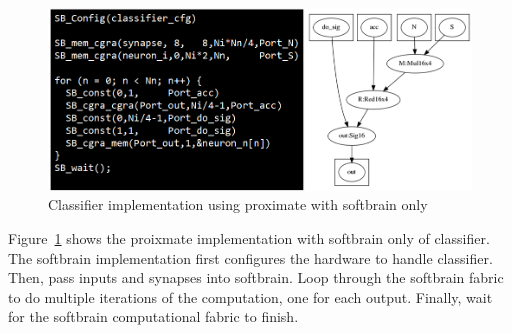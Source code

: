 \begin{figure}
  \begin{center}
    \includegraphics[width=\linewidth]{cs758-figs/classifier-prx_sb_only.png}
  \end{center}
\vspace{-0.2in}
  \caption{Classifier implementation using proximate with softbrain only}
  \label{fig:classifier-prx_sb_only}
\vspace{-0.05in}
\end{figure}

Figure~\ref{fig:classifier-prx_sb_only} shows the proixmate implementation 
with softbrain only of classifier. The softbrain implementation first configures the
hardware to handle classifier. Then, pass inputs and synapses into softbrain. 
Loop through the softbrain fabric to do multiple iterations of the computation, one for each output.
Finally, wait for the softbrain computational fabric to finish. 
